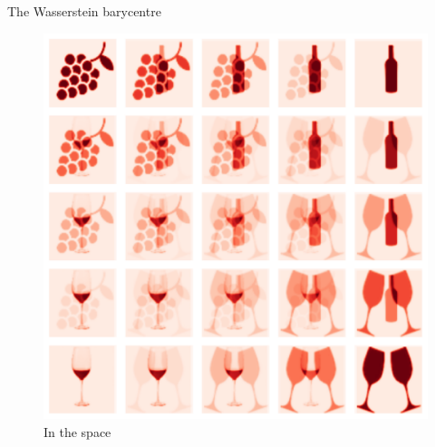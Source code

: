 \documentclass[pdf,aspectratio=169,10pt]{beamer}
\begin{document}
\begin{frame}[plain]{The Wasserstein barycentre}
     \\
    \begin{minipage}{0.48\textwidth}
        
    \begin{figure}
        \centering
            \includegraphics[clip, height=0.7\textheight]{../img/symboles_wine_L2.pdf}
            \caption{In the  space }
        \end{figure}
        

\end{minipage}
\end{frame}
\end{document}
